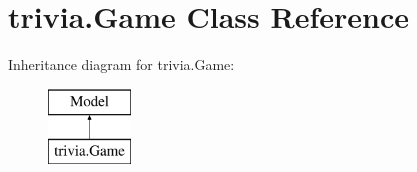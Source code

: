 \hypertarget{classtrivia_1_1Game}{}\section{trivia.\+Game Class Reference}
\label{classtrivia_1_1Game}
Inheritance diagram for trivia.\+Game\+:\begin{figure}[H]
\begin{center}
\leavevmode
\includegraphics[height=2.000000cm]{classtrivia_1_1Game}
\end{center}
\end{figure}
